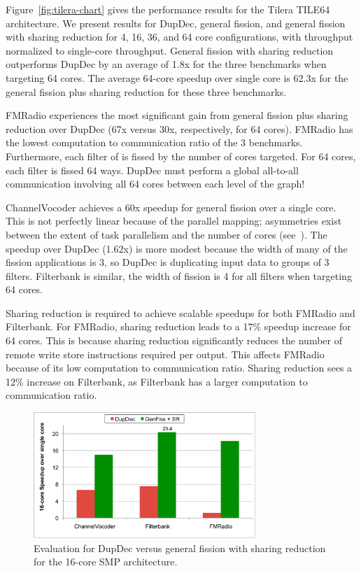 Figure~\ref{fig:tilera-chart} gives the performance results for the
Tilera TILE64 architecture.  We present results for DupDec, general
fission, and general fission with sharing reduction for 4, 16, 36, and
64 core configurations, with throughput normalized to single-core
throughput.  General fission with sharing reduction outperforms
DupDec by an average of 1.8x for the three benchmarks when targeting
64 cores. The average 64-core speedup over single core is 62.3x for the
general fission plus sharing reduction for these three benchmarks.

FMRadio experiences the most significant gain from general fission
plus sharing reduction over DupDec (67x versus 30x, respectively, for
64 cores).  FMRadio has the lowest computation to communication ratio
of the 3 benchmarks.  Furthermore, each filter of is fissed by the
number of cores targeted.  For 64 cores, each filter is fissed 64
ways.  DupDec must perform a global all-to-all communication involving
all 64 cores between each level of the graph!
 
ChannelVocoder achieves a 60x speedup for general fission over a
single core.  This is not perfectly linear because of the parallel
mapping; asymmetries exist between the extent of task parallelism and
the number of cores (see~\cite{gordon-asplos06}).  The speedup over
DupDec (1.62x) is more modest because the width of many of the
fission applications is 3, so DupDec is duplicating input data to
groups of 3 filters.  Filterbank is similar, the width of fission is 4
for all filters when targeting 64 cores.

Sharing reduction is required to achieve scalable speedups for both
FMRadio and Filterbank.  For FMRadio, sharing reduction leads to a
17\% speedup increase for 64 cores.  This is because sharing reduction
significantly reduces the number of remote write store instructions
required per output.  This affects FMRadio because of its low
computation to communication ratio.  Sharing reduction sees a 12\%
increase on Filterbank, as Filterbank has a larger computation to
communication ratio.

\begin{figure}[t]
\centering
\includegraphics[width=3.3in]{figures/smp-chart.pdf}
\caption[Comparing the fission techniques on the 16-core SMP.]{
  Evaluation for DupDec versus general fission with sharing reduction
  for the 16-core SMP architecture.  \label{fig:smp-chart}}
\end{figure}

